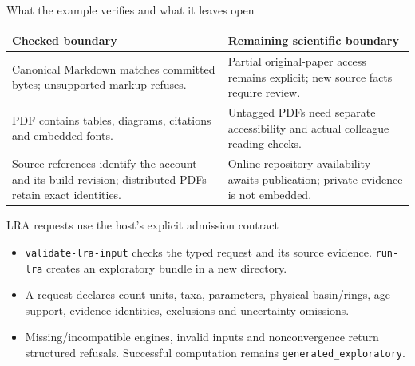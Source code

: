 \begin{frame}{What the example verifies and what it leaves open}
\small
\begin{tabular}{p{.40\linewidth}p{.47\linewidth}}
\toprule
Checked boundary & Remaining scientific boundary \\
\midrule
Canonical Markdown matches committed bytes; unsupported markup refuses. & Partial original-paper access remains explicit; new source facts require review. \\
PDF contains tables, diagrams, citations and embedded fonts. & Untagged PDFs need separate accessibility and actual colleague reading checks. \\
Source references identify the account and its build revision; distributed PDFs retain exact identities. & Online repository availability awaits publication; private evidence is not embedded. \\
\bottomrule
\end{tabular}
\end{frame}

\begin{frame}{LRA requests use the host's explicit admission contract}
\begin{itemize}
\item \texttt{validate-lra-input} checks the typed request and its source evidence. \texttt{run-lra} creates an exploratory bundle in a new directory.
\item A request declares count units, taxa, parameters, physical basin/rings, age support, evidence identities, exclusions and uncertainty omissions.
\item Missing/incompatible engines, invalid inputs and nonconvergence return structured refusals. Successful computation remains \texttt{generated\_exploratory}.
\end{itemize}
\end{frame}

